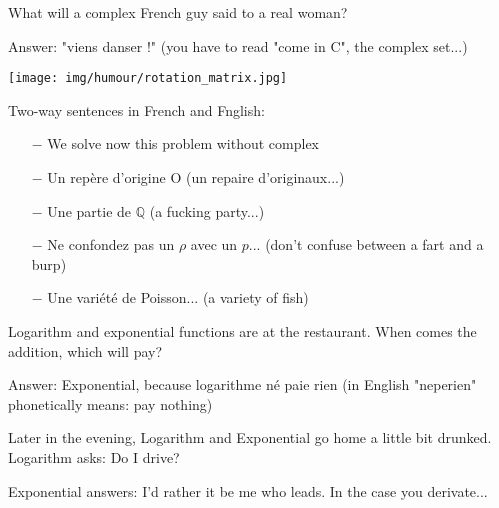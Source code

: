 What will a complex French guy said to a real woman?

Answer: "viens danser !" (you have to read "come in C", the complex set...)
	\begin{center}\underline{\hspace{5 cm}}\end{center}
	
	\begin{center}
		\texttt{[image: img/humour/rotation\_matrix.jpg]}	
	\end{center}
	
	\begin{center}\underline{\hspace{5 cm}}\end{center}

Two-way sentences in French and Fnglish:

\begin{itemize}	 
	\item[$-$] We solve now this problem without complex

	\item[$-$] Un repère d'origine O (un repaire d'originaux...) 

	\item[$-$] Une partie de $\mathbb{Q}$ (a fucking party...)

	\item[$-$] Ne confondez pas un $\rho$ avec un $p$... (don't confuse between a fart and a burp)

	\item[$-$] Une variété de Poisson... (a variety of fish)
\end{itemize}
	\begin{center}\underline{\hspace{5 cm}}\end{center}

Logarithm and exponential functions are at the restaurant. When comes the addition, which will pay?

Answer: Exponential, because logarithme né paie rien (in English "neperien" phonetically means: pay nothing)

Later in the evening, Logarithm and Exponential go home a little bit drunked. Logarithm asks: Do I drive?

Exponential answers: I'd rather it be me who leads. In the case you derivate...
	\begin{center}\underline{\hspace{5 cm}}\end{center}

